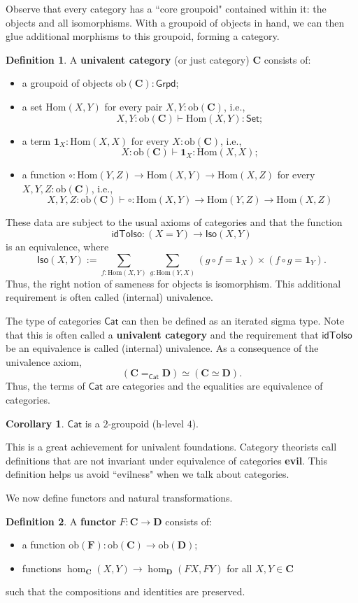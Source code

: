 \documentclass{amsart}
\theoremstyle{definition}
\newtheorem{defn}{Definition}[section]
\newtheorem*{cor}{Corollary}
\newcommand{\Set}{\ensuremath{\mathsf{Set}}}
\newcommand{\Cat}{\ensuremath{\mathsf{Cat}}}
\newcommand{\idToIso}{\ensuremath{\mathsf{idToIso}}}
\newcommand{\Iso}{\ensuremath{\mathsf{Iso}}}
\newcommand{\Grpd}{\ensuremath{\mathsf{Grpd}}}
\newcommand{\ob}[1]{\ensuremath{\mathrm{ob}{(\cat{#1})}}}
\newcommand{\cHom}[2]{\ensuremath{\mathrm{Hom}(#1,#2)}}
\newcommand{\cId}{\ensuremath{\mathbf{1}}}
\newcommand{\cat}[1]{\ensuremath{\mathbf{#1}}}
\renewcommand{\emph}{\textbf}
\begin{document}
Observe that every category has a ``core groupoid" contained within it: the objects and all isomorphisms.
With a groupoid of objects in hand, we can then glue additional morphisms to this groupoid, forming a category.
\begin{defn}
    A \emph{univalent category} (or just category) $\cat{C}$ consists of:
\begin{itemize}
    \item a groupoid of objects $\ob{C} : \Grpd$;
    \item a set $\cHom{X}{Y}$ for every pair $X,Y : \ob{C}$, i.e., $$X,Y : \ob{C} \vdash \cHom{X}{Y} : \Set;$$
    \item a term $\cId_{X} : \cHom{X}{X}$ for every $X : \ob{C}$, i.e., $$X:\ob{C} \vdash \cId_{X} : \cHom{X}{X};$$
    \item a function $\circ: \cHom{Y}{Z} \to \cHom{X}{Y} \to \cHom{X}{Z}$ for every $X,Y,Z : \ob{C}$, i.e., $$X,Y,Z: \ob{C} \vdash \circ : \cHom{X}{Y} \to \cHom{Y}{Z}\to \cHom{X}{Z}$$
\end{itemize}
These data are subject to the usual axioms of categories and that the function
\[
    \idToIso: (X=Y) \to \Iso(X,Y)
\]
is an equivalence, where 
$$\Iso(X,Y) := \sum_{f:\cHom{X}{Y}} \sum_{g:\cHom{Y}{X}} (g\circ f = \cId_{X}) \times (f \circ g = \cId_{Y}).$$
Thus, the right notion of sameness for objects is isomorphism.
This additional requirement is often called (internal) univalence.
\end{defn}
The type of categories $\Cat$ can then be defined as an iterated sigma type.
Note that this is often called a \emph{univalent category} and the requirement that $\idToIso$ be an equivalence is called (internal) univalence.
As a consequence of the univalence axiom,
\[
    (\cat{C} =_{\Cat} \cat{D}) \simeq (\cat{C} \simeq \cat{D}).
\]
Thus, the terms of $\Cat$ are categories and the equalities are equivalence of categories.
\begin{cor}
    $\Cat$ is a $2$-groupoid (h-level $4$).
\end{cor}
This is a great achievement for univalent foundations.
Category theorists call definitions that are not invariant under equivalence of categories \emph{evil}.
This definition helps us avoid ``evilness" when we talk about categories.

We now define functors and natural transformations. 
\begin{defn}
    A \emph{functor} $F: \cat{C}\to\cat{D}$ consists of:
\begin{itemize}
    \item a function $\ob{F}: \ob{C}\to \ob{D}$;
    \item functions $\hom_{\mathbf C}(X,Y)\to \hom_{\mathbf D}(FX,FY)$ for all $X,Y\in \mathbf C$
\end{itemize}
such that the compositions and identities are preserved.
\end{defn}
\end{document}
